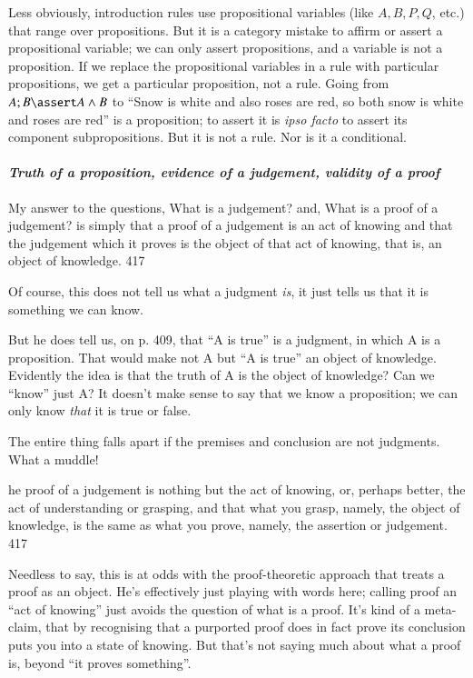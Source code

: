 \documentclass{article}
\begin{document}
Less obviously, introduction rules use propositional variables (like
\(A, B, P, Q\), etc.) that range over propositions. But it is a
category mistake to affirm or assert a propositional variable; we can
only assert propositions, and a variable is not a proposition. If
we replace the propositional variables in a rule with particular
propositions, we get a particular proposition, not a rule. Going from
\(A; B \linfer A\land B\) to ``Snow is white and also roses are red, so
both snow is white and roses are red'' is a proposition; to assert it
is \textit{ipso facto} to assert its component subpropositions. But it
is not a rule.  Nor is it a conditional.

\paragraph{\textit{Truth of a proposition, evidence of a judgement, validity of a proof}}

\begin{displayquote}
  My answer to the questions, What is a judgement? and, What is a proof of a judgement? is simply that a proof of a judgement is an act of knowing and that the judgement which it proves is the object of that act of knowing, that is, an object of knowledge.
  \parencite{martin1987truth} 417
\end{displayquote}

Of course, this does not tell us what a judgment \textit{is}, it just
tells us that it is something we can know.

But he does tell us, on p. 409, that ``A is true'' is a judgment, in
which A is a proposition. That would make not A but ``A is true'' an
object of knowledge. Evidently the idea is that the truth of A is the
object of knowledge? Can we ``know'' just A? It doesn't make sense to
say that we know a proposition; we can only know \textit{that} it is
true or false.

The entire thing falls apart if the premises and conclusion are not
judgments. What a muddle!

\begin{displayquote}
  [T]he proof of a judgement is nothing but the act of knowing, or,
  perhaps better, the act of understanding or grasping, and that what
  you grasp, namely, the object of knowledge, is the same as what you
  prove, namely, the assertion or judgement. \parencite{martin1987truth}
  417
\end{displayquote}

Needless to say, this is at odds with the proof-theoretic approach
that treats a proof as an object. He's effectively just playing with
words here; calling proof an ``act of knowing'' just avoids the
question of what is a proof. It's kind of a meta-claim, that by
recognising that a purported proof does in fact prove its conclusion
puts you into a state of knowing. But that's not saying much about
what a proof is, beyond ``it proves something''.
\end{document}
